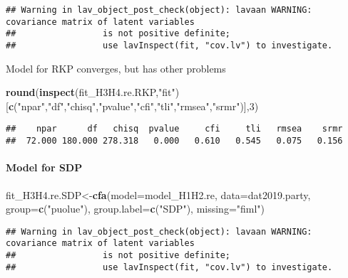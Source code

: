\documentclass[
]{article}
\newenvironment{Shaded}{\begin{snugshade}}{\end{snugshade}}
\newcommand{\DataTypeTok}[1]{\textcolor[rgb]{0.13,0.29,0.53}{#1}}
\newcommand{\DecValTok}[1]{\textcolor[rgb]{0.00,0.00,0.81}{#1}}
\newcommand{\KeywordTok}[1]{\textcolor[rgb]{0.13,0.29,0.53}{\textbf{#1}}}
\newcommand{\NormalTok}[1]{#1}
\newcommand{\StringTok}[1]{\textcolor[rgb]{0.31,0.60,0.02}{#1}}
\begin{document}
\begin{verbatim}
## Warning in lav_object_post_check(object): lavaan WARNING: covariance matrix of latent variables
##                 is not positive definite;
##                 use lavInspect(fit, "cov.lv") to investigate.
\end{verbatim}

Model for RKP converges, but has other problems

\begin{Shaded}
\begin{Highlighting}[]
\KeywordTok{round}\NormalTok{(}\KeywordTok{inspect}\NormalTok{(fit_H3H4.re.RKP,}\StringTok{"fit"}\NormalTok{)}
\NormalTok{      [}\KeywordTok{c}\NormalTok{(}\StringTok{"npar"}\NormalTok{,}\StringTok{"df"}\NormalTok{,}\StringTok{"chisq"}\NormalTok{,}\StringTok{"pvalue"}\NormalTok{,}\StringTok{"cfi"}\NormalTok{,}\StringTok{"tli"}\NormalTok{,}\StringTok{"rmsea"}\NormalTok{,}\StringTok{"srmr"}\NormalTok{)],}\DecValTok{3}\NormalTok{)}
\end{Highlighting}
\end{Shaded}

\begin{verbatim}
##    npar      df   chisq  pvalue     cfi     tli   rmsea    srmr 
##  72.000 180.000 278.318   0.000   0.610   0.545   0.075   0.156
\end{verbatim}

\newpage

\hypertarget{model-for-sdp}{%
\paragraph{Model for SDP}\label{model-for-sdp}}

\begin{Shaded}
\begin{Highlighting}[]
\NormalTok{fit_H3H4.re.SDP<-}\KeywordTok{cfa}\NormalTok{(}\DataTypeTok{model=}\NormalTok{model_H1H2.re,}
                    \DataTypeTok{data=}\NormalTok{dat2019.party,}
                    \DataTypeTok{group=}\KeywordTok{c}\NormalTok{(}\StringTok{"puolue"}\NormalTok{),}
                    \DataTypeTok{group.label=}\KeywordTok{c}\NormalTok{(}\StringTok{"SDP"}\NormalTok{),}
                    \DataTypeTok{missing=}\StringTok{"fiml"}\NormalTok{)}
\end{Highlighting}
\end{Shaded}

\begin{verbatim}
## Warning in lav_object_post_check(object): lavaan WARNING: covariance matrix of latent variables
##                 is not positive definite;
##                 use lavInspect(fit, "cov.lv") to investigate.
\end{verbatim}
\end{document}
